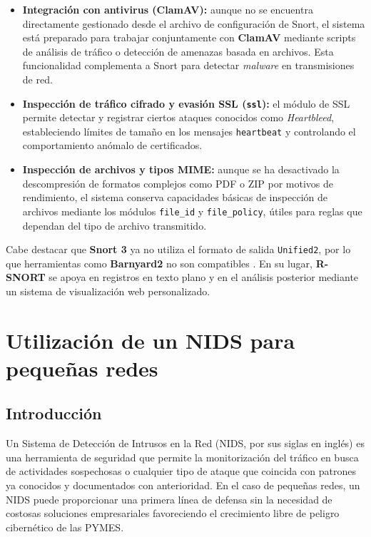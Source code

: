 \documentclass[12pt,a4paper]{report}
\begin{document}
\begin{itemize}
	\item \textbf{Integración con antivirus (ClamAV):}  
	aunque no se encuentra directamente gestionado desde el archivo de configuración de Snort, el sistema está preparado para trabajar conjuntamente con \textbf{ClamAV} mediante scripts de análisis de tráfico o detección de amenazas basada en archivos. Esta funcionalidad complementa a Snort para detectar \textit{malware} en transmisiones de red.
	
	\item \textbf{Inspección de tráfico cifrado y evasión SSL (\texttt{ssl}):}  
	el módulo de SSL permite detectar y registrar ciertos ataques conocidos como \textit{Heartbleed}, estableciendo límites de tamaño en los mensajes \texttt{heartbeat} y controlando el comportamiento anómalo de certificados.
	
	\item \textbf{Inspección de archivos y tipos MIME:}  
	aunque se ha desactivado la descompresión de formatos complejos como PDF o ZIP por motivos de rendimiento, el sistema conserva capacidades básicas de inspección de archivos mediante los módulos \texttt{file\_id} y \texttt{file\_policy}, útiles para reglas que dependan del tipo de archivo transmitido.
\end{itemize}

Cabe destacar que \textbf{Snort 3} ya no utiliza el formato de salida \texttt{Unified2}, por lo que herramientas como \textbf{Barnyard2} no son compatibles \cite{snort_gui_update}. En su lugar, \textbf{R-SNORT} se apoya en registros en texto plano y en el análisis posterior mediante un sistema de visualización web personalizado.

\chapter{Utilización de un NIDS para pequeñas redes}
\section{Introducción}
Un Sistema de Detección de Intrusos en la Red (NIDS, por sus siglas en inglés) es una herramienta de seguridad que permite la monitorización del tráfico en busca de actividades sospechosas o cualquier tipo de ataque que coincida con patrones ya conocidos y documentados con anterioridad. En el caso de pequeñas redes, un NIDS puede proporcionar una primera línea de defensa sin la necesidad de costosas soluciones empresariales favoreciendo el crecimiento libre de peligro cibernético de las PYMES.
\newline
\end{document}
